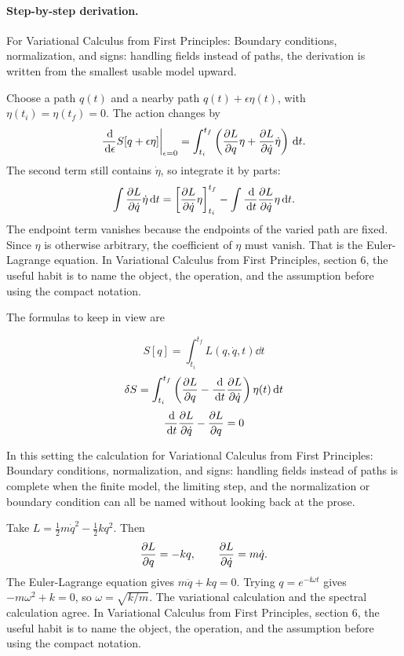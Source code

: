 \paragraph{Step-by-step derivation.}

For Variational Calculus from First Principles: Boundary conditions, normalization, and signs: handling fields instead of paths, the derivation is written from the smallest usable model upward.

Choose a path \(q(t)\) and a nearby path \(q(t)+\epsilon\eta(t)\), with \(\eta(t_i)=\eta(t_f)=0\).  The action changes by
\[
  \frac{\,\mathrm d}{\,\mathrm d\epsilon}S[q+\epsilon\eta]\bigg|_{\epsilon=0}
  =
  \int_{t_i}^{t_f}
  \left(
  \frac{\partial L}{\partial q}\eta+\frac{\partial L}{\partial\dot q}\dot\eta
  \right)\,\mathrm d t.
\]
The second term still contains \(\dot\eta\), so integrate it by parts:
\[
  \int \frac{\partial L}{\partial\dot q}\dot\eta\,\mathrm d t
  =
  \left[\frac{\partial L}{\partial\dot q}\eta\right]_{t_i}^{t_f}
  -
  \int \frac{\,\mathrm d}{\,\mathrm d t}\frac{\partial L}{\partial\dot q}\eta\,\mathrm d t.
\]
The endpoint term vanishes because the endpoints of the varied path are fixed.  Since \(\eta\) is otherwise arbitrary, the coefficient of \(\eta\) must vanish.  That is the Euler-Lagrange equation.  In Variational Calculus from First Principles, section 6, the useful habit is to name the object, the operation, and the assumption before using the compact notation.

The formulas to keep in view are

\[
  S[q]=\int_{t_i}^{t_f}L(q,\dot q,t)\dd t
\]
\[
  \delta S=\int_{t_i}^{t_f}\left(\frac{\partial L}{\partial q}-\frac{\,\mathrm d}{\,\mathrm d t}\frac{\partial L}{\partial\dot q}\right)\eta(t)\,\mathrm d t
\]
\[
  \frac{\,\mathrm d}{\,\mathrm d t}\frac{\partial L}{\partial\dot q}-\frac{\partial L}{\partial q}=0
\]

In this setting the calculation for Variational Calculus from First Principles: Boundary conditions, normalization, and signs: handling fields instead of paths is complete when the finite model, the limiting step, and the normalization or boundary condition can all be named without looking back at the prose.




\begin{example}
Take \(L=\frac12m\dot q^2-\frac12kq^2\).  Then
\[
  \frac{\partial L}{\partial q}=-kq,\qquad \frac{\partial L}{\partial\dot q}=m\dot q.
\]
The Euler-Lagrange equation gives \(m\ddot q+kq=0\).  Trying \(q=e^{-\ii\omega t}\) gives \(-m\omega^2+k=0\), so \(\omega=\sqrt{k/m}\).  The variational calculation and the spectral calculation agree.  In Variational Calculus from First Principles, section 6, the useful habit is to name the object, the operation, and the assumption before using the compact notation.
\end{example}



